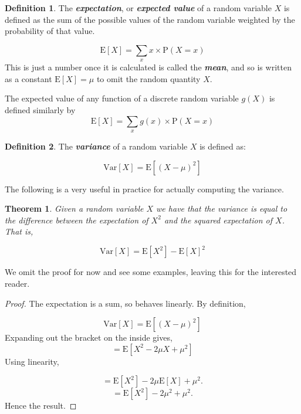 \documentclass[
]{book}
\newtheorem{theorem}{Theorem}[chapter]
\theoremstyle{definition}
\newtheorem{definition}{Definition}[chapter]
\theoremstyle{definition}
\theoremstyle{definition}
\theoremstyle{definition}
\theoremstyle{remark}
\begin{document}
\begin{definition}
The \textbf{\emph{expectation}}, or \textbf{\emph{expected value}} of a random variable \(X\) is defined as the sum of the possible values of the random variable weighted by the probability of that value.

\[ \text{E}[X] = \sum_x x\times\text{P}(X=x)\]
This is just a number once it is calculated is called the \textbf{\emph{mean}}, and so is written as a constant \(\text{E}[X]=\mu\) to omit the random quantity \(X\).

The expected value of any function of a discrete random variable \(g(X)\) is defined similarly by
\[ \text{E}[X] = \sum_x g(x)\times\text{P}(X=x)\]
\end{definition}

\begin{definition}
The \textbf{\emph{variance}} of a random variable \(X\) is defined as:

\[ \text{Var}[X] = \text{E}[(X-\mu)^2]\]
\end{definition}

The following is a very useful in practice for actually computing the variance.

\begin{theorem}
Given a random variable \(X\) we have that the variance is equal to the difference between the expectation of \(X^2\) and the squared expectation of \(X\). That is,

\[ \text{Var}[X]=\text{E}[X^2]-\text{E}[X]^2 \]
\end{theorem}

We omit the proof for now and see some examples, leaving this for the interested reader.

\begin{proof}
The expectation is a sum, so behaves linearly. By definition,

\[\text{Var}[X] = \text{E}[(X-\mu)^2]\]
Expanding out the bracket on the inside gives,
\[ = \text{E}[X^2 - 2\mu X +\mu^2] \]
Using linearity,

\[= \text{E}[X^2]-2\mu\text{E}[X]+\mu^2.\]
\[= \text{E}[X^2]-2\mu^2+\mu^2.\]
Hence the result.
\end{proof}
\end{document}
